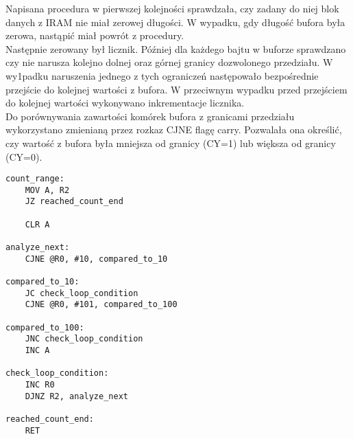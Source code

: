\documentclass[a4paper,12pt]{article}
\begin{document}
\noindent
Napisana procedura w pierwszej kolejności sprawdzała, czy zadany do niej blok danych z IRAM nie miał zerowej długości. W wypadku, gdy długość bufora była zerowa, nastąpić miał powrót z procedury.\\

\noindent
Następnie zerowany był licznik. Później dla każdego bajtu w buforze sprawdzano czy nie narusza kolejno dolnej oraz górnej granicy dozwolonego przedziału. W wy1padku naruszenia jednego z tych ograniczeń następowało bezpośrednie przejście do kolejnej wartości z bufora. W przeciwnym wypadku przed przejściem do kolejnej wartości wykonywano inkrementacje licznika.\\

\noindent
Do porównywania zawartości komórek bufora z granicami przedziału wykorzystano zmienianą przez rozkaz CJNE flagę carry. Pozwalała ona określić, czy wartość z bufora była mniejsza od granicy (CY=1) lub większa od granicy (CY=0).

\begin{lstlisting}[frame=single, basicstyle=\small, caption={Kod z zadania 5}, label={lst.zad4.2}]
count_range:
	MOV A, R2
	JZ reached_count_end
	
	CLR A

analyze_next:
	CJNE @R0, #10, compared_to_10

compared_to_10:
	JC check_loop_condition
	CJNE @R0, #101, compared_to_100

compared_to_100:
	JNC check_loop_condition
	INC A

check_loop_condition:
	INC R0
	DJNZ R2, analyze_next

reached_count_end:
	RET
\end{lstlisting}
\vspace{5mm}
\end{document}
